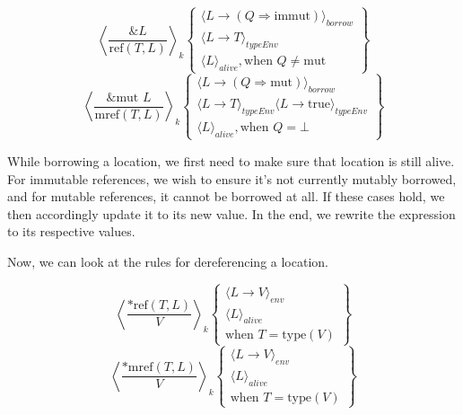 \documentclass[review,twocolumn]{sigplanconf}
\begin{document}
\begin{small}
  \[
    \left\langle
    \frac{ \&L }{ \text{ref}(T, L) }
    \right\rangle _k
    \left\{
    \begin{array}{l}
      \langle L \rightarrow (Q \Rightarrow \text{immut}) \rangle_{borrow} \\
      \langle L \rightarrow T\rangle_{typeEnv}                            \\
      \langle L \rangle_{alive}, \text{when } Q \neq \text{mut}
    \end{array}
    \right\}
  \]
  \[
    \left\langle
    \frac{ \&\text{mut }L }{ \text{mref}(T, L) }
    \right\rangle _k
    \left\{
    \begin{array}{l}
      \langle L \rightarrow (Q \Rightarrow \text{mut}) \rangle_{borrow}                           \\
      \langle L \rightarrow T\rangle_{typeEnv} \langle L \rightarrow \text{true}\rangle_{typeEnv} \\
      \langle L \rangle_{alive}, \text{when } Q = \bot
    \end{array}
    \right\}
  \]
\end{small}

While borrowing a location, we first need to make sure that location is still alive. For immutable references, we wish to ensure it's not currently mutably borrowed, and for mutable references, it cannot be borrowed at all. If these cases hold, we then accordingly update it to its new value. In the end, we rewrite the expression to its respective values.

Now, we can look at the rules for dereferencing a location.

\begin{small}
  \[
    \left\langle
    \frac{ *\text{ref}(T, L) }{ V }
    \right\rangle _k
    \left\{
    \begin{array}{l}
      \langle L \rightarrow V \rangle_{env} \\
      \langle L \rangle_{alive}             \\
      \text{when } T = \text{type}(V)
    \end{array}
    \right\}
  \]
  \[
    \left\langle
    \frac{ *\text{mref}(T, L) }{ V }
    \right\rangle _k
    \left\{
    \begin{array}{l}
      \langle L \rightarrow V \rangle_{env} \\
      \langle L \rangle_{alive}             \\
      \text{when } T = \text{type}(V)
    \end{array}
    \right\}
  \]
\end{small}
\end{document}
